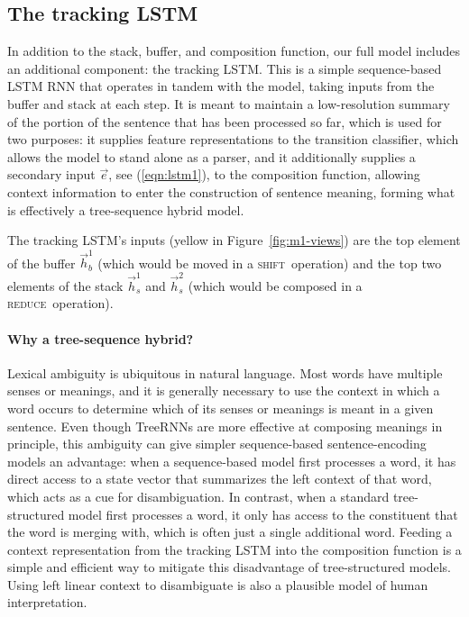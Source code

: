 \documentclass[11pt]{article}
\newcommand{\shift}{\textsc{shift}}
\newcommand{\reduce}{\textsc{reduce}}
\begin{document}
\subsection{The tracking LSTM}\label{sec:tracking}

In addition to the stack, buffer, and composition function, our full model includes an additional component: the tracking LSTM. This is a simple sequence-based LSTM RNN that operates in tandem with the model, taking inputs from the buffer and stack at each step. It is meant to maintain a low-resolution summary of the portion of the sentence that has been processed so far, which is used for two purposes: it supplies feature representations to the transition classifier, which allows the model to stand alone as a parser, and it additionally supplies a secondary input $\vec{e}$, see (\ref{eqn:lstm1}), to the composition function, allowing context information to enter the construction of sentence meaning,  forming what is effectively a tree-sequence hybrid model.

The tracking LSTM's inputs (yellow in Figure~\ref{fig:m1-views}) are the top element of the buffer $\vec{h}_b^1$ (which would be moved in a \shift\ operation) and the top two elements of the stack $\vec{h}_s^1$ and $\vec{h}_s^2$ (which would be composed in a \reduce\ operation).

\paragraph{Why a tree-sequence hybrid?}

Lexical ambiguity is ubiquitous in natural language. Most words have multiple senses or meanings, and it is generally necessary to use the context in which a word occurs to determine which of its senses or meanings is meant in a given sentence. Even though TreeRNNs are more effective at composing meanings in principle, this ambiguity can give simpler sequence-based sentence-encoding models an advantage: when a sequence-based model first processes a word, it has direct access to a state vector that summarizes the left context of that word, which acts as a cue for disambiguation. In contrast, when a standard tree-structured model first processes a word, it only has access to the constituent that the word is merging with, which is often just a single additional word. Feeding a context representation from the tracking LSTM into the composition function is a simple and efficient way to mitigate this disadvantage of tree-structured models. Using left linear context to disambiguate is also a plausible model of human interpretation.
\end{document}
